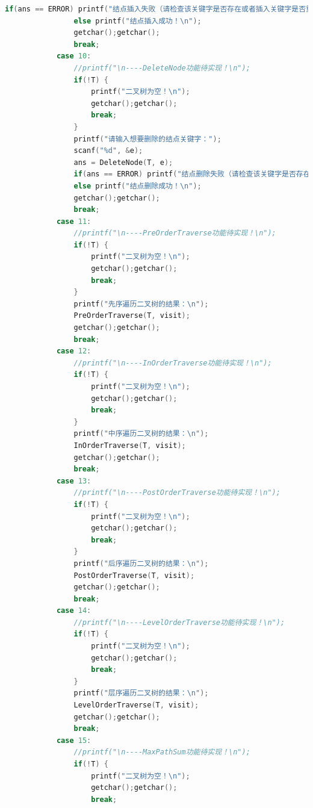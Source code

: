 \documentclass[supercite]{Experimental_Report}
\theoremstyle{definition}
\begin{document}
\begin{lstlisting}[language=c]
                if(ans == ERROR) printf("结点插入失败（请检查该关键字是否存在或者插入关键字是否重复）!\n");
                else printf("结点插入成功！\n");
                getchar();getchar();
                break;
            case 10:
                //printf("\n----DeleteNode功能待实现！\n");
                if(!T) {
                    printf("二叉树为空！\n");
                    getchar();getchar();
                    break;
                }
                printf("请输入想要删除的结点关键字：");
                scanf("%d", &e);
                ans = DeleteNode(T, e);
                if(ans == ERROR) printf("结点删除失败（请检查该关键字是否存在）!\n");
                else printf("结点删除成功！\n");
                getchar();getchar();
                break;
            case 11:
                //printf("\n----PreOrderTraverse功能待实现！\n");
                if(!T) {
                    printf("二叉树为空！\n");
                    getchar();getchar();
                    break;
                }
                printf("先序遍历二叉树的结果：\n");
                PreOrderTraverse(T, visit);
                getchar();getchar();
                break;
            case 12:
                //printf("\n----InOrderTraverse功能待实现！\n");
                if(!T) {
                    printf("二叉树为空！\n");
                    getchar();getchar();
                    break;
                }
                printf("中序遍历二叉树的结果：\n");
                InOrderTraverse(T, visit);
                getchar();getchar();
                break;
            case 13:
                //printf("\n----PostOrderTraverse功能待实现！\n");
                if(!T) {
                    printf("二叉树为空！\n");
                    getchar();getchar();
                    break;
                }
                printf("后序遍历二叉树的结果：\n");
                PostOrderTraverse(T, visit);
                getchar();getchar();
                break;
            case 14:
                //printf("\n----LevelOrderTraverse功能待实现！\n");
                if(!T) {
                    printf("二叉树为空！\n");
                    getchar();getchar();
                    break;
                }
                printf("层序遍历二叉树的结果：\n");
                LevelOrderTraverse(T, visit);
                getchar();getchar();
                break;
            case 15:
                //printf("\n----MaxPathSum功能待实现！\n");
                if(!T) {
                    printf("二叉树为空！\n");
                    getchar();getchar();
                    break;

\end{lstlisting}
\end{document}
